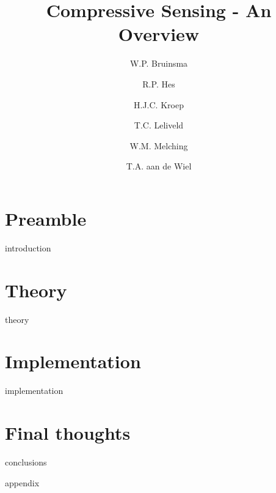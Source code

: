 \documentclass[a4paper, openany, oneside]{memoir}
\title{Compressive Sensing - An Overview}
\author{W.P. Bruinsma \and R.P. Hes \and H.J.C. Kroep \and T.C. Leliveld \and W.M. Melching \and T.A. aan de Wiel}
\begin{document}
\frontmatter

\begin{titlingpage}
  \pagestyle{empty}
  \maketitle
\end{titlingpage}


\tableofcontents

\mainmatter
\part{Preamble}
{introduction}
\part{Theory}
{theory}
\part{Implementation}
{implementation}
\part{Final thoughts}
{conclusions}

\backmatter
{}
\printbibliography

{appendix}

\appendix
\end{document}

